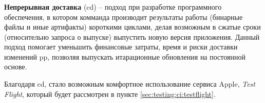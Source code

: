 \subsubsection{}
\label{sec:testing:ci:cd}

\textbf{Непрерывная доставка} (\gls{cd}) -- подход при разработке программного обеспечения, в котором комманда производит результаты работы (бинарные файлы и иные артифакты) короткими циклами, делая возможным в сжатые сроки (относительно запроса о выпуске) выпустить новую версия приложения. Данный подход помогает уменьшить финансовые затраты, время и риски доставки изменений \gls{pp}, позволяя выпускать итарационные обновления на постоянной основе.

Благодаря \gls{cd}, стало возможным комфортное использование сервиса Apple, \textit{Test Flight}, который будет рассмотрен в пункте \ref{sec:testing:ci:testflight}.